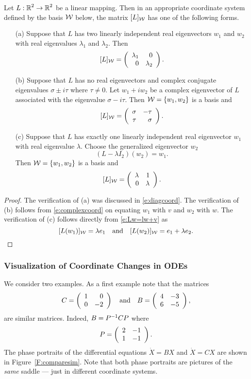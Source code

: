 \documentclass{ximera}
\begin{document}
\begin{theorem}  \label{T:putinform2}
Let $L:\mbox{$\Bbb{R}$}^2\to\mbox{$\Bbb{R}$}^2$ be a linear mapping.  Then in an appropriate
coordinate system defined by the basis ${\cal W}$ below, the matrix
$[L]_{\cal W}$ has one of the following forms.
\begin{itemize}
\item[(a)]	Suppose that $L$ has two linearly independent
real eigenvectors $w_1$ and $w_2$ with real eigenvalues $\lambda_1$
and $\lambda_2$.  Then
\[
[L]_{\cal W} = \left(\begin{array}{rr} \lambda_1 & 0\\ 0 &\lambda_2\end{array}\right).
\]

\item[(b)]	Suppose that $L$ has no real eigenvectors and
complex conjugate eigenvalues $\sigma\pm i\tau$ where
$\tau\neq 0$.  Let $w_1+iw_2$ be a complex eigenvector of $L$
associated with the eigenvalue $\sigma-i\tau$.
Then ${\cal W}=\{w_1,w_2\}$ is a basis and
\[
[L]_{\cal W} = \left(\begin{array}{rr} \sigma & -\tau\\ \tau &\sigma\end{array}\right).
\]

\item[(c)]	Suppose that $L$ has exactly one linearly
independent real eigenvector $w_1$ with real eigenvalue $\lambda$.
Choose the generalized eigenvector $w_2$
\begin{equation}  \label{e:Lw=lw+v}
(L-\lambda I_2)(w_2) =  w_1.
\end{equation}
Then ${\cal W}=\{w_1,w_2\}$ is a basis and
\[
[L]_{\cal W} = \left(\begin{array}{rr} \lambda & 1\\ 0 &\lambda\end{array}\right).
\]
\end{itemize}
\end{theorem}

\begin{proof}
The verification of (a) was discussed in \eqref{e:diagcoord}.  The
verification of (b) follows from 
\eqref{e:complexcoord} on equating $w_1$ with $v$ and $w_2$ with $w$.
The verification of (c) follows directly from \eqref{e:Lw=lw+v} as
\[
[L(w_1)]_{\cal W} = \lambda e_1 \quad\mbox{and}\quad [L(w_2)]_{\cal W} = e_1+\lambda e_2.
\]
\end{proof}



\subsubsection*{Visualization of Coordinate Changes in ODEs}

We consider two examples.  As a first example note that the matrices
\[
C = \left(\begin{array}{rr} 1 & 0\\ 0 &-2\end{array}\right) \quad\mbox{and}\quad B = \left(\begin{array}{rr} 4 & -3\\ 6 &-5\end{array}\right),
\]
are similar matrices.   Indeed, $B = P^{-1} CP$ where
\begin{equation}  \label{e:Pchange}
P = \left(\begin{array}{rr} 2 & -1\\ 1 &-1\end{array}\right).
\end{equation}
The phase portraits of the differential equations $\dot{X}=BX$ and
$\dot{X}=CX$ are shown in Figure~\ref{F:comparesim}.  Note that both
phase portraits are pictures of the {\em same\/} saddle ---
just in different coordinate systems.
\end{document}

